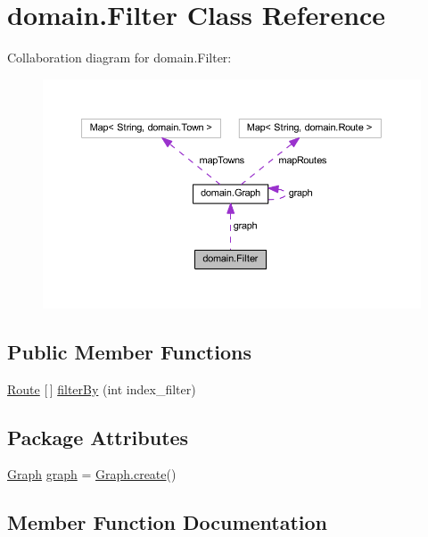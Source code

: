 \hypertarget{classdomain_1_1_filter}{}\section{domain.\+Filter Class Reference}
\label{classdomain_1_1_filter}


Collaboration diagram for domain.\+Filter\+:\nopagebreak
\begin{figure}[H]
\begin{center}
\leavevmode
\includegraphics[width=350pt]{classdomain_1_1_filter__coll__graph}
\end{center}
\end{figure}
\subsection*{Public Member Functions}
\begin{DoxyCompactItemize}
\item 
\hyperlink{classdomain_1_1_route}{Route} \mbox{[}$\,$\mbox{]} \hyperlink{classdomain_1_1_filter_a5935a1a7d6f7b13de220ed9b6547b897}{filter\+By} (int index\+\_\+filter)
\end{DoxyCompactItemize}
\subsection*{Package Attributes}
\begin{DoxyCompactItemize}
\item 
\hyperlink{classdomain_1_1_graph}{Graph} \hyperlink{classdomain_1_1_filter_afdd7492ce4c44ba22ad16e3ad819a70c}{graph} = \hyperlink{classdomain_1_1_graph_a57ce4efd344c059a565f4bb104fdee64}{Graph.\+create}()
\end{DoxyCompactItemize}


\subsection{Member Function Documentation}
\mbox{\label{classdomain_1_1_filter_a5935a1a7d6f7b13de220ed9b6547b897}} 
